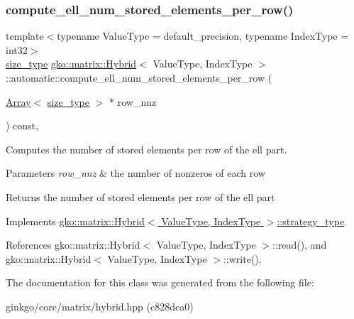 \subsubsection{\texorpdfstring{compute\+\_\+ell\+\_\+num\+\_\+stored\+\_\+elements\+\_\+per\+\_\+row()}{compute\_ell\_num\_stored\_elements\_per\_row()}}
{\footnotesize\ttfamily template$<$typename Value\+Type = default\+\_\+precision, typename Index\+Type = int32$>$ \\
\hyperlink{namespacegko_a6e5c95df0ae4e47aab2f604a22d98ee7}{size\+\_\+type} \hyperlink{classgko_1_1matrix_1_1Hybrid}{gko\+::matrix\+::\+Hybrid}$<$ Value\+Type, Index\+Type $>$\+::automatic\+::compute\+\_\+ell\+\_\+num\+\_\+stored\+\_\+elements\+\_\+per\+\_\+row (\begin{DoxyParamCaption}\item[{\hyperlink{classgko_1_1Array}{Array}$<$ \hyperlink{namespacegko_a6e5c95df0ae4e47aab2f604a22d98ee7}{size\+\_\+type} $>$ $\ast$}]{row\+\_\+nnz }\end{DoxyParamCaption}) const\hspace{0.3cm}{\ttfamily [override]}, {\ttfamily [virtual]}}



Computes the number of stored elements per row of the ell part. 


\begin{DoxyParams}{Parameters}
{\em row\+\_\+nnz} & the number of nonzeros of each row\\
\hline
\end{DoxyParams}
\begin{DoxyReturn}{Returns}
the number of stored elements per row of the ell part 
\end{DoxyReturn}


Implements \hyperlink{classgko_1_1matrix_1_1Hybrid_1_1strategy__type_a0a0cd4024f27c7d0f286f35fc0a6de60}{gko\+::matrix\+::\+Hybrid$<$ Value\+Type, Index\+Type $>$\+::strategy\+\_\+type}.



References gko\+::matrix\+::\+Hybrid$<$ Value\+Type, Index\+Type $>$\+::read(), and gko\+::matrix\+::\+Hybrid$<$ Value\+Type, Index\+Type $>$\+::write().



The documentation for this class was generated from the following file\+:\begin{DoxyCompactItemize}
\item 
ginkgo/core/matrix/hybrid.\+hpp (c828dca0)\end{DoxyCompactItemize}
